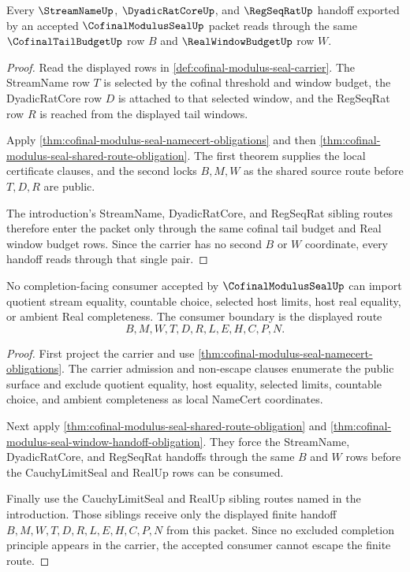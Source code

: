 \begin{theorem}
\label{thm:cofinal-modulus-seal-window-handoff-obligation}
Every $\StreamNameUp$, $\DyadicRatCoreUp$, and $\RegSeqRatUp$ handoff exported by an accepted $\CofinalModulusSealUp$ packet reads through the same $\CofinalTailBudgetUp$ row $B$ and $\RealWindowBudgetUp$ row $W$.
\end{theorem}
\begin{proof}
Read the displayed rows in \autoref{def:cofinal-modulus-seal-carrier}. The StreamName row $T$ is selected by the cofinal threshold and window budget, the DyadicRatCore row $D$ is attached to that selected window, and the RegSeqRat row $R$ is reached from the displayed tail windows.

Apply \autoref{thm:cofinal-modulus-seal-namecert-obligations} and then \autoref{thm:cofinal-modulus-seal-shared-route-obligation}. The first theorem supplies the local certificate clauses, and the second locks $B,M,W$ as the shared source route before $T,D,R$ are public.

The introduction's StreamName, DyadicRatCore, and RegSeqRat sibling routes therefore enter the packet only through the same cofinal tail budget and Real window budget rows. Since the carrier has no second $B$ or $W$ coordinate, every handoff reads through that single pair.
\end{proof}

\begin{theorem}
\label{thm:cofinal-modulus-seal-completion-nonescape-obligation}
No completion-facing consumer accepted by $\CofinalModulusSealUp$ can import quotient stream equality, countable choice, selected host limits, host real equality, or ambient Real completeness. The consumer boundary is the displayed route
$$
B,M,W,T,D,R,L,E,H,C,P,N.
$$
\end{theorem}
\begin{proof}
First project the carrier and use \autoref{thm:cofinal-modulus-seal-namecert-obligations}. The carrier admission and non-escape clauses enumerate the public surface and exclude quotient equality, host equality, selected limits, countable choice, and ambient completeness as local NameCert coordinates.

Next apply \autoref{thm:cofinal-modulus-seal-shared-route-obligation} and \autoref{thm:cofinal-modulus-seal-window-handoff-obligation}. They force the StreamName, DyadicRatCore, and RegSeqRat handoffs through the same $B$ and $W$ rows before the CauchyLimitSeal and RealUp rows can be consumed.

Finally use the CauchyLimitSeal and RealUp sibling routes named in the introduction. Those siblings receive only the displayed finite handoff $B,M,W,T,D,R,L,E,H,C,P,N$ from this packet. Since no excluded completion principle appears in the carrier, the accepted consumer cannot escape the finite route.
\end{proof}

